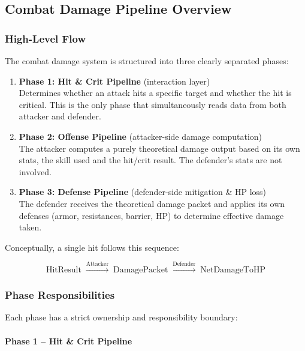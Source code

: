 \subsection{Combat Damage Pipeline Overview}
\label{subsec:combat-pipeline-overview}

\subsubsection{High-Level Flow}

The combat damage system is structured into three clearly separated phases:

\begin{enumerate}
	\item \textbf{Phase 1: Hit \& Crit Pipeline} (interaction layer) \\
	Determines whether an attack hits a specific target and whether the hit is critical.
	This is the only phase that simultaneously reads data from both attacker and defender.
	\item \textbf{Phase 2: Offense Pipeline} (attacker-side damage computation) \\
	The attacker computes a purely theoretical damage output based on its own stats,
	the skill used and the hit/crit result. The defender's stats are not involved.
	\item \textbf{Phase 3: Defense Pipeline} (defender-side mitigation \& HP loss) \\
	The defender receives the theoretical damage packet and applies its own defenses
	(armor, resistances, barrier, HP) to determine effective damage taken.
\end{enumerate}

Conceptually, a single hit follows this sequence:

\[
\text{HitResult}
\;\xrightarrow{\text{Attacker}}\;
\text{DamagePacket}
\;\xrightarrow{\text{Defender}}\;
\text{NetDamageToHP}
\]

\subsubsection{Phase Responsibilities}

Each phase has a strict ownership and responsibility boundary:

\paragraph{Phase 1 -- Hit \& Crit Pipeline}

